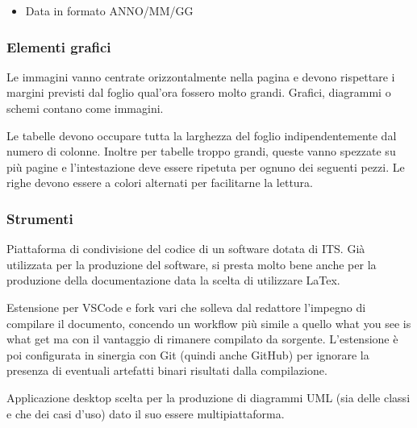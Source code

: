     \begin{itemize}
    \item Data in formato ANNO/MM/GG
    \end{itemize}

\subsubsection{Elementi grafici}

    Le immagini vanno centrate orizzontalmente nella pagina e devono rispettare i margini previsti dal foglio qual'ora
    fossero molto grandi.
    Grafici, diagrammi o schemi contano come immagini.

    Le tabelle devono occupare tutta la larghezza del foglio indipendentemente dal numero di colonne.
    Inoltre per tabelle troppo grandi, queste vanno spezzate su più pagine e l'intestazione deve essere ripetuta
    per ognuno dei seguenti pezzi.
    Le righe devono essere a colori alternati per facilitarne la lettura.

\subsubsection{Strumenti}

    Piattaforma di condivisione del codice di un software dotata di ITS. Già utilizzata per la produzione del software, si presta
    molto bene anche per la produzione della documentazione data la scelta di utilizzare LaTex.

    Estensione per VSCode e fork vari che solleva dal redattore l'impegno di compilare il documento, concendo un workflow più simile
    a quello what you see is what get ma con il vantaggio di rimanere compilato da sorgente.
    L'estensione è poi configurata in sinergia con Git (quindi anche GitHub) per ignorare la presenza di eventuali artefatti binari
    risultati dalla compilazione.

    Applicazione desktop scelta per la produzione di diagrammi UML (sia delle classi e che dei casi d'uso) dato il suo essere
    multipiattaforma.
